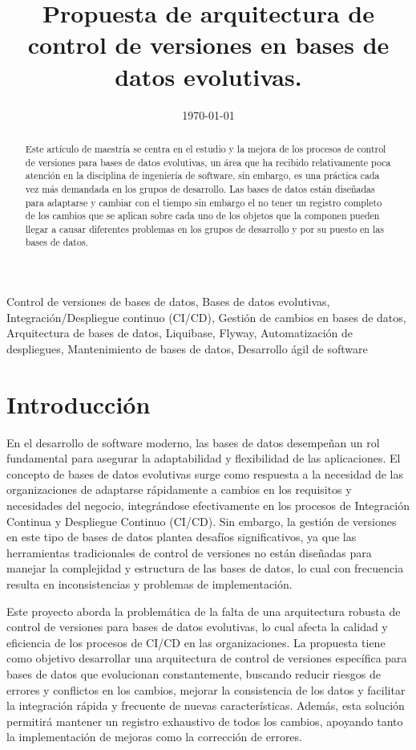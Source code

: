 \documentclass{IEEEtran}
\title{Propuesta de arquitectura de control de versiones en bases de datos evolutivas.}
\author{\IEEEauthorblockN{ Gerardo Adolfo Salas Montoya}
\IEEEauthorblockA{\\Maestría en ingeniería de software con énfasis en arquitectura y diseño de software.\\
Universidad Cenfotec\\
San Jose, Costa Rica\\
Email: gsalasm@ucenfotec.ac.cr }}
\date{\today}
\begin{document}
\maketitle

\begin{abstract}
    Este artículo de maestría se centra en el estudio y la mejora de los procesos de control de versiones para bases de datos evolutivas, un área que ha recibido relativamente poca atención en la disciplina de ingeniería de software, sin embargo, es una práctica cada vez más demandada en los grupos de desarrollo. Las bases de datos están diseñadas para adaptarse y cambiar con el tiempo sin embargo el no tener un registro completo de los cambios que se aplican sobre cada uno de los objetos que la componen pueden llegar a causar diferentes problemas en los grupos de desarrollo y por su puesto en las bases de datos.
\end{abstract}
    
\begin{IEEEkeywords}
    Control de versiones de bases de datos,
    Bases de datos evolutivas,
    Integración/Despliegue continuo (CI/CD),
    Gestión de cambios en bases de datos,
    Arquitectura de bases de datos,
    Liquibase,
    Flyway,
    Automatización de despliegues,
    Mantenimiento de bases de datos,
    Desarrollo ágil de software
\end{IEEEkeywords}

\section{Introducción}
En el desarrollo de software moderno, las bases de datos desempeñan un rol fundamental para asegurar la adaptabilidad y flexibilidad de las aplicaciones. El concepto de bases de datos evolutivas surge como respuesta a la necesidad de las organizaciones de adaptarse rápidamente a cambios en los requisitos y necesidades del negocio, integrándose efectivamente en los procesos de Integración Continua y Despliegue Continuo (CI/CD). Sin embargo, la gestión de versiones en este tipo de bases de datos plantea desafíos significativos, ya que las herramientas tradicionales de control de versiones no están diseñadas para manejar la complejidad y estructura de las bases de datos, lo cual con frecuencia resulta en inconsistencias y problemas de implementación.

Este proyecto aborda la problemática de la falta de una arquitectura robusta de control de versiones para bases de datos evolutivas, lo cual afecta la calidad y eficiencia de los procesos de CI/CD en las organizaciones. La propuesta tiene como objetivo desarrollar una arquitectura de control de versiones específica para bases de datos que evolucionan constantemente, buscando reducir riesgos de errores y conflictos en los cambios, mejorar la consistencia de los datos y facilitar la integración rápida y frecuente de nuevas características. Además, esta solución permitirá mantener un registro exhaustivo de todos los cambios, apoyando tanto la implementación de mejoras como la corrección de errores.
\end{document}
